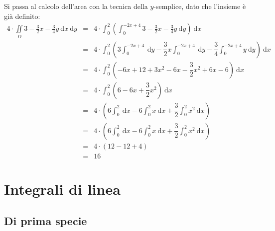 \documentclass[a4paper]{article}
\begin{document}
	\noindent
	Si passa al calcolo dell'area con la tecnica della $y$-semplice, dato che l'insieme è già definito:
	\begin{equation*}
		\begin{array}{rcl}
			4\cdot\displaystyle\iint\limits_{D} 3 - \frac{3}{2}x - \frac{3}{4}y \:\mathrm{d}x\:\mathrm{d}y
			&=&
			4\cdot\displaystyle\int_{0}^{2} \left(\int_{0}^{-2x + 4} 3 - \frac{3}{2}x - \frac{3}{4}y \:\mathrm{d}y\right)\:\mathrm{d}x \\ [1.5em]
			&=&
			4 \cdot \displaystyle\int_{0}^{2} \left(3\int_{0}^{-2x + 4}\:\mathrm{d}y -\dfrac{3}{2}x\int_{0}^{-2x + 4} \:\mathrm{d}y - \dfrac{3}{4}\int_{0}^{-2x + 4} y\:\mathrm{d}y\right) \:\mathrm{d}x \\ [1.5em]
			&=&
			4 \cdot \displaystyle\int_{0}^{2} \left(-6x+12 +3x^{2}-6x -\dfrac{3}{2}x^{2}+6x-6\right) \:\mathrm{d}x \\ [1.5em]
			&=&
			4 \cdot \displaystyle\int_{0}^{2} \left(6 -6x +\dfrac{3}{2}x^{2}\right) \:\mathrm{d}x \\ [1.5em]
			&=&
			4 \cdot \left(6\displaystyle\int_{0}^{2} \:\mathrm{d}x -6\displaystyle\int_{0}^{2} x \:\mathrm{d}x + \dfrac{3}{2}\displaystyle\int_{0}^{2} x^{2} \:\mathrm{d}x\right) \\ [1.5em]
			&=&
			4 \cdot \left(6\displaystyle\int_{0}^{2} \:\mathrm{d}x -6\displaystyle\int_{0}^{2} x \:\mathrm{d}x + \dfrac{3}{2}\displaystyle\int_{0}^{2} x^{2} \:\mathrm{d}x\right) \\ [1.5em]
			&=&
			4 \cdot \left(12 - 12 + 4\right) \\ [1em]
			&=&
			16
		\end{array}
	\end{equation*}

	\newpage

	\section{Integrali di linea}

	\subsection{Di prima specie}
\end{document}
